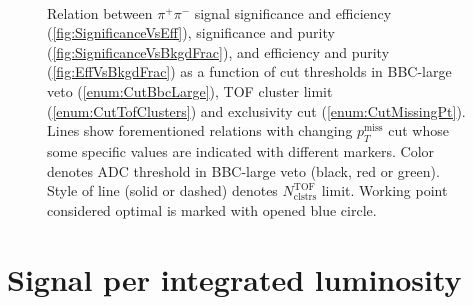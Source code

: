 \begin{figure}[hb]
{\begin{subfigure}[b]{\linewidth}
  \end{subfigure}\\
  \begin{minipage}[t][1.042\linewidth][t]{\linewidth}\vspace{10pt}
    \caption[Relation between $\pi^{+}\pi^{-}$ significance, efficiency and purity vs. thresholds in cuts~\ref{enum:CutBbcLarge}, \ref{enum:CutTofClusters} and \ref{enum:CutMissingPt}]{Relation between $\pi^{+}\pi^{-}$ signal significance and efficiency (\ref{fig:SignificanceVsEff}), significance and purity (\ref{fig:SignificanceVsBkgdFrac}), and efficiency and purity (\ref{fig:EffVsBkgdFrac}) as a function of cut thresholds in BBC-large veto (\ref{enum:CutBbcLarge}), TOF cluster limit (\ref{enum:CutTofClusters}) and exclusivity cut (\ref{enum:CutMissingPt}). Lines show forementioned relations with changing $p_{T}^\text{miss}$ cut whose some specific values are indicated with different markers. Color denotes ADC threshold in BBC-large veto (black, red or green). Style of line (solid or dashed) denotes $N^{\text{TOF}}_{\text{clstrs}}$ limit. Working point considered optimal is marked with opened blue circle.}\label{fig:workingPoint}
  \end{minipage}
}%

\end{figure}


\section{Signal per integrated luminosity}

